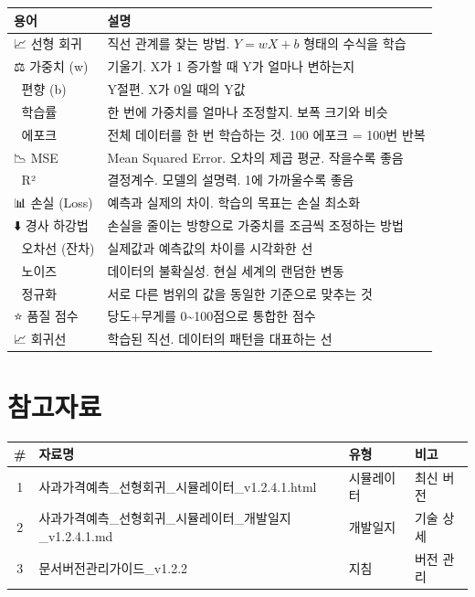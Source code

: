 \documentclass[11pt,a4paper]{article}
\begin{document}
\begin{center}
\begin{longtable}{lp{9cm}}
\toprule
\textbf{용어} & \textbf{설명} \\
\midrule
\endhead

📈 선형 회귀 & 직선 관계를 찾는 방법. $Y = wX + b$ 형태의 수식을 학습 \\
\midrule
⚖️ 가중치 (w) & 기울기. X가 1 증가할 때 Y가 얼마나 변하는지 \\
\midrule
🎯 편향 (b) & Y절편. X가 0일 때의 Y값 \\
\midrule
🚶 학습률 & 한 번에 가중치를 얼마나 조정할지. 보폭 크기와 비슷 \\
\midrule
🔄 에포크 & 전체 데이터를 한 번 학습하는 것. 100 에포크 = 100번 반복 \\
\midrule
📉 MSE & Mean Squared Error. 오차의 제곱 평균. 작을수록 좋음 \\
\midrule
🎯 R² & 결정계수. 모델의 설명력. 1에 가까울수록 좋음 \\
\midrule
📊 손실 (Loss) & 예측과 실제의 차이. 학습의 목표는 손실 최소화 \\
\midrule
⬇️ 경사 하강법 & 손실을 줄이는 방향으로 가중치를 조금씩 조정하는 방법 \\
\midrule
📏 오차선 (잔차) & 실제값과 예측값의 차이를 시각화한 선 \\
\midrule
🎲 노이즈 & 데이터의 불확실성. 현실 세계의 랜덤한 변동 \\
\midrule
📐 정규화 & 서로 다른 범위의 값을 동일한 기준으로 맞추는 것 \\
\midrule
⭐ 품질 점수 & 당도+무게를 0\textasciitilde100점으로 통합한 점수 \\
\midrule
📈 회귀선 & 학습된 직선. 데이터의 패턴을 대표하는 선 \\
\bottomrule
\end{longtable}
\end{center}

\section*{참고자료}

\begin{center}
\begin{tabular}{clll}
\toprule
\textbf{\#} & \textbf{자료명} & \textbf{유형} & \textbf{비고} \\
\midrule
1 & 사과가격예측\_선형회귀\_시뮬레이터\_v1.2.4.1.html & 시뮬레이터 & 최신 버전 \\
2 & 사과가격예측\_선형회귀\_시뮬레이터\_개발일지\_v1.2.4.1.md & 개발일지 & 기술 상세 \\
3 & 문서버전관리가이드\_v1.2.2 & 지침 & 버전 관리 \\
\bottomrule
\end{tabular}
\end{center}
\end{document}
